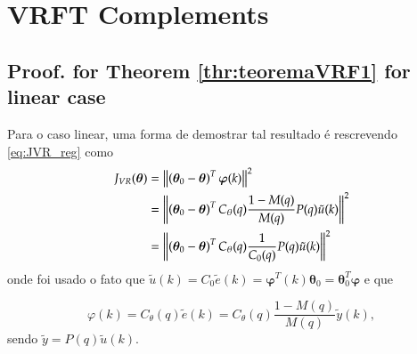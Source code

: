 
\chapter{VRFT Complements}\label{cap:AppA}

\section{Proof. for Theorem \ref{thr:teoremaVRF1} for linear case}%
\label{sec:proof_linear}

Para o caso linear, uma forma de demostrar tal resultado é rescrevendo \eqref{eq:JVR_reg} como
%
\begin{align}
   \label{eq:JVRlin}
   J_{V R}(\bm{\theta}) &=\left\lVert\left(\bm{\theta}_0-\bm{\theta}\right)^T \bm{\varphi}(k)\right\rVert^{2} \nonumber\\
   &=\left\lVert\left(\bm{\theta}_{0}-\bm{\theta}\right)^T C_\theta(q) \frac{1-M(q)}{M(q)} P(q) \tilde{u}(k)\right\rVert^{2} \nonumber\\
   &=\left\lVert\left(\bm{\theta}_{0}-\bm{\theta}\right)^T C_\theta(q) \frac{1}{C_0(q)} P(q) \tilde{u}(k)\right\rVert^{2}
\end{align}
onde foi usado o fato que $\tilde{u}(k)=C_0\tilde{e}(k)=\bm{\varphi}^T(k)\bm{\theta}_0 = \bm{\theta}_0^T\bm{\varphi}$ e que 

\begin{equation}
   \varphi(k)=C_\theta(q) \tilde{e}(k)=C_\theta(q) \frac{1-M(q)}{M(q)} \tilde{y}(k),
\end{equation}
sendo $\tilde{y}=P(q)\tilde{u}(k)$.

